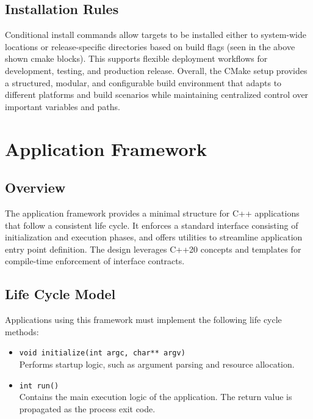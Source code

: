 \subsection{Installation Rules}

Conditional install commands allow targets to be installed either to system-wide locations or release-specific directories based on build flags (seen in the above shown cmake blocks). This supports flexible deployment workflows for development, testing, and production release. Overall, the CMake setup provides a structured, modular, and configurable build environment that adapts to different platforms and build scenarios while maintaining centralized control over important variables and paths.


















\section{Application Framework}
\label{sec:app-framework}

\subsection*{Overview}
The application framework provides a minimal structure for C++ applications that follow a consistent life cycle. It enforces a standard interface consisting of initialization and execution phases, and offers utilities to streamline application entry point definition. The design leverages C++20 concepts and templates for compile-time enforcement of interface contracts.

\subsection*{Life Cycle Model}
Applications using this framework must implement the following life cycle methods:
\begin{itemize}
	\item \texttt{void initialize(int argc, char** argv)} \\
	Performs startup logic, such as argument parsing and resource allocation.
	\item \texttt{int run()} \\
	Contains the main execution logic of the application. The return value is propagated as the process exit code.
\end{itemize}

